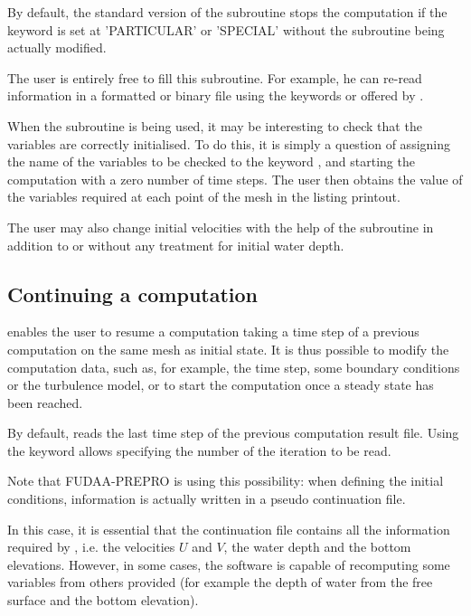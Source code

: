 By default, the standard version of the  subroutine
stops the computation if the keyword  is set
at 'PARTICULAR' or 'SPECIAL' without the subroutine being actually modified.

The user is entirely free to fill this subroutine.
For example, he can re-read information in a formatted or binary file
using the keywords  or 
offered by .

When the  subroutine is being used,
it may be interesting to check that the variables are correctly initialised.
To do this, it is simply a question of assigning the name of the variables
to be checked to the keyword ,
and starting the computation with a zero number of time steps.
The user then obtains the value of the variables required
at each point of the mesh in the listing printout.

The user may also change initial velocities with the help of the
 subroutine in addition to or without
any treatment for initial water depth.

\subsection{Continuing a computation}
\label{subs:cont:comput}
 enables the user to resume a computation taking a time step
of a previous computation on the same mesh as initial state.
It is thus possible to modify the computation data, such as, for example,
the time step, some boundary conditions or the turbulence model,
or to start the computation once a steady state has been reached.

By default,  reads the last time step of the previous computation
result file.
Using the keyword  allows specifying
the number of the iteration to be read.

Note that FUDAA-PREPRO is using this possibility:
when defining the initial conditions, information is actually written
in a pseudo continuation file.

In this case, it is essential that the continuation file contains
all the information required by , i.e. the velocities $U$ and $V$,
the water depth and the bottom elevations.
However, in some cases, the software is capable of recomputing some
variables from others provided
(for example the depth of water from the free surface and the bottom elevation).


